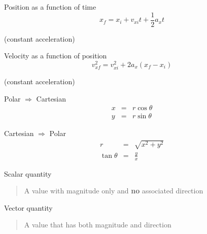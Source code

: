 \documentclass[avery5371]{flashcards}
\begin{document}
\begin{flashcard}[Chapter 2]{Position as a function of time}
\bigskip
\begin{displaymath}
x_{f} = x_{i} + v_{xi}t + \frac{1}{2}a_{x}t
\end{displaymath}
\begin{center}
(constant acceleration)
\end{center}
\end{flashcard}

\begin{flashcard}[Chapter 2]{Velocity as a function of position}
\bigskip
\begin{displaymath}
v_{xf}^{2} = v_{xi}^{2} + 2a_{x}\left( x_{f} - x_{i}\right) 
\end{displaymath}
\begin{center}
(constant acceleration)
\end{center}
\end{flashcard}


\begin{flashcard}[Chapter 3]{Polar $\Longrightarrow$ Cartesian}
\bigskip
\bigskip
\begin{eqnarray}
x &=& r\cos \theta \nonumber\\
y &=& r\sin \theta \nonumber
\end{eqnarray}
\end{flashcard}

\begin{flashcard}[Chapter 3]{Cartesian $\Longrightarrow$ Polar}
\bigskip
\bigskip
\begin{eqnarray}
r &=& \sqrt{x^{2} + y^{2}} \nonumber\\
\tan \theta &=& \frac{y}{x} \nonumber
\end{eqnarray}
\end{flashcard}

\begin{flashcard}[Chapter 3]{Scalar quantity}
\bigskip
\bigskip
\begin{quote}
A value with magnitude only and \textbf{no} associated direction
\end{quote}
\hfill
\end{flashcard}

\begin{flashcard}[Chapter 3]{Vector quantity}
\bigskip
\bigskip
\begin{quote}
A value that has both magnitude and direction
\end{quote}
\hfill
\end{flashcard}
\end{document}
